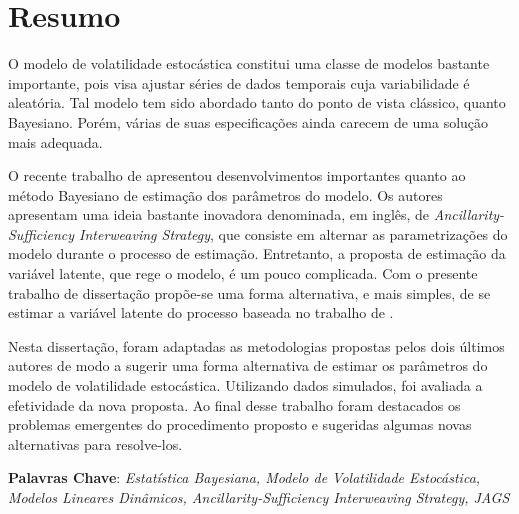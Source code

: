 \chapter*{Resumo}

O modelo de volatilidade estocástica \citep{kim} constitui uma classe de modelos bastante importante, pois visa ajustar séries de dados temporais cuja variabilidade é aleatória. Tal modelo tem sido abordado tanto do ponto de vista clássico, quanto Bayesiano. Porém, várias de suas especificações ainda carecem de uma solução mais adequada.

O recente trabalho de \cite{kastner}  apresentou desenvolvimentos importantes quanto ao método Bayesiano de estimação dos parâmetros do modelo. Os autores apresentam uma ideia bastante inovadora denominada, em inglês, de \textit{Ancillarity-Sufficiency Interweaving Strategy}, que consiste em alternar as parametrizações do modelo durante o processo de estimação. Entretanto, a proposta de estimação da variável latente, que rege o modelo, é um pouco complicada. Com o presente trabalho de dissertação propõe-se uma forma alternativa, e mais simples, de se estimar a variável latente do processo baseada no trabalho de \cite{mccormick}.

Nesta dissertação, foram adaptadas as metodologias propostas pelos dois últimos autores de modo a sugerir uma forma alternativa de estimar os parâmetros do modelo de volatilidade estocástica. Utilizando dados simulados, foi avaliada a efetividade da nova proposta. Ao final desse trabalho foram destacados os problemas emergentes do procedimento proposto e sugeridas algumas novas alternativas para resolve-los.
\newline

\noindent \textbf{Palavras Chave}: \textit{Estatística Bayesiana, Modelo de Volatilidade Estocástica, Modelos Lineares Dinâmicos, Ancillarity-Sufficiency Interweaving Strategy, JAGS}
